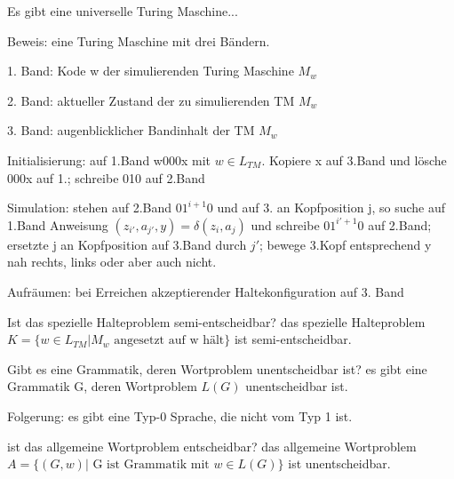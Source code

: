 \documentclass[avery5371, frame]{flashcards}
\begin{document}
\begin{flashcard}[Satz]{Es gibt eine universelle Turing Maschine...}
    \scriptsize{
        Beweis: eine Turing Maschine mit drei Bändern.
        \begin{enumerate*}
            \item 1. Band: Kode w der simulierenden Turing Maschine $M_w$
            \item 2. Band: aktueller Zustand der zu simulierenden TM $M_w$
            \item 3. Band: augenblicklicher Bandinhalt der TM $M_w$
        \end{enumerate*}
        \begin{itemize*}
            \item Initialisierung: auf 1.Band w000x mit $w\in L_{TM}$. Kopiere x auf 3.Band und lösche 000x auf 1.; schreibe 010 auf 2.Band
            \item Simulation: stehen auf 2.Band $01^{i+1}0$ und auf 3. an Kopfposition j, so suche auf 1.Band Anweisung $(z_{i'},a_{j'},y)=\delta(z_i,a_j)$ und schreibe $01^{i'+1}0$ auf 2.Band; ersetzte j an Kopfposition auf 3.Band durch $j'$; bewege 3.Kopf entsprechend y nah rechts, links oder aber auch nicht.
            \item Aufräumen: bei Erreichen akzeptierender Haltekonfiguration auf 3. Band
        \end{itemize*}
    }
\end{flashcard}

\begin{flashcard}[Satz]{Ist das spezielle Halteproblem semi-entscheidbar?}
    das spezielle Halteproblem $K=\{w\in L_{TM} | M_w \text{ angesetzt auf w hält}\}$ ist semi-entscheidbar.
\end{flashcard}

\begin{flashcard}[Satz]{Gibt es eine Grammatik, deren Wortproblem unentscheidbar ist?}
    es gibt eine Grammatik G, deren Wortproblem $L(G)$ unentscheidbar ist.

    Folgerung: es gibt eine Typ-0 Sprache, die nicht vom Typ 1 ist.
\end{flashcard}

\begin{flashcard}[Satz]{ist das allgemeine Wortproblem entscheidbar?}
    das allgemeine Wortproblem $A=\{(G,w) | \text{ G ist Grammatik mit } w\in L(G)\}$ ist unentscheidbar.
\end{flashcard}
\end{document}
